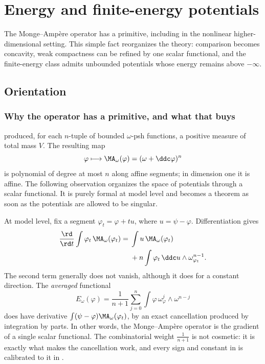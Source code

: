 \chapter{Energy and finite-energy potentials}
\label{chap:bfj-energy}

The Monge--Amp\`ere operator has a primitive, including in the nonlinear
higher-dimensional setting.  This
simple fact reorganizes the theory: comparison becomes concavity, weak
compactness can be refined by one scalar functional, and the finite-energy
class admits unbounded potentials whose energy remains above $-\infty$.

\section{Orientation}
\label{sec:ch26-orientation}

\subsection{Why the operator has a primitive, and what that buys}
\label{sec:ch26-why}

 produced, for each $n$-tuple of bounded
$\omega$-psh functions, a positive measure of total mass $V$.  The
resulting map
\[
 \varphi\longmapsto\MA_\omega(\varphi)
 =(\omega+\ddc\varphi)^n
\]
is polynomial of degree at most $n$ along affine segments; in dimension
one it is affine.  The following observation organizes the space of
potentials through a scalar functional.  It is
purely formal at model level and becomes a theorem as soon as the potentials
are allowed to be singular.

At model level, fix a segment
$\varphi_t=\varphi+t u$, where $u=\psi-\varphi$.  Differentiation gives
\begin{equation}
\label{eq:ch26-motivating-variation}
\begin{aligned}
 \frac{\rd}{\rd t}\int\varphi_t\,\MA_\omega(\varphi_t)
 ={}&\int u\,\MA_\omega(\varphi_t)\\
 &+n\int\varphi_t\,\ddc u\wedge\omega_{\varphi_t}^{n-1}.
\end{aligned}
\end{equation}
The second term generally does not vanish, although it does for a constant
direction.  The \emph{averaged} functional
\[
 E_\omega(\varphi)
 =\frac1{n+1}\sum_{j=0}^n\int\varphi\,
   \omega_\varphi^j\wedge\omega^{n-j}
\]
does have derivative $\int(\psi-\varphi)\MA_\omega(\varphi_t)$, by an exact
cancellation produced by integration by parts.  In other words, the
Monge--Amp\`ere operator is the gradient of a single scalar functional.  The
combinatorial weight $\tfrac1{n+1}$ is not cosmetic: it is exactly what
makes the cancellation work, and every sign and constant in
 is calibrated to it in .

